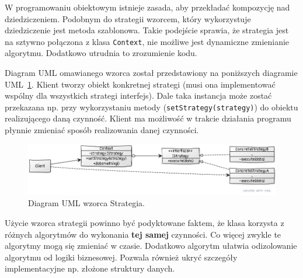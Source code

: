 W programowaniu obiektowym istnieje zasada, aby przekładać kompozycję nad dziedziczeniem. Podobnym do strategii wzorcem, który wykorzystuje dziedziczenie jest metoda szablonowa. Takie podejście sprawia, że strategia jest na sztywno połączona z klasa \texttt{Context}, nie możliwe jest dynamiczne zmienianie algorytmu. Dodatkowo utrudnia to zrozumienie kodu. 




Diagram UML omawianego wzorca został przedstawiony na poniższych diagramie UML~\ref{lab4/fig/StrategyUml}. Klient tworzy obiekt konkretnej strategi (musi ona implementować wspólny dla wszystkich strategi interfejs). Dale taka instancja może zostać przekazana np. przy wykorzystaniu metody (\texttt{setStrategy(strategy)}) do obiektu realizującego daną czynność. Klient ma możliwość w trakcie działania programu płynnie zmieniać sposób realizowania danej czynności.

\begin{figure}[hbt!]
	\centering
	\includegraphics[width=0.9\linewidth]{images/StrategyUml}
	\caption{Diagram UML wzorca Strategia.}
	\label{lab4/fig/StrategyUml}
\end{figure}
%

Użycie wzorca strategii powinno być podyktowane faktem, że klasa korzysta z różnych algorytmów do wykonania \textbf{tej samej} czynności. Co więcej zwykle te algorytmy mogą się zmieniać w czasie. Dodatkowo algorytm ułatwia odizolowanie algorytmu od logiki biznesowej. Pozwala również ukryć szczegóły implementacyjne np. złożone struktury danych. 

